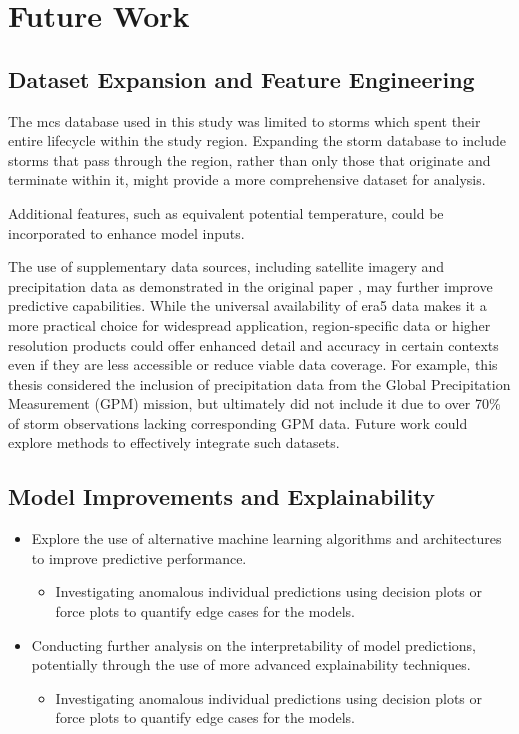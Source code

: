 \section{Future Work}

\subsection{Dataset Expansion and Feature Engineering}

The \acrshort{mcs} database used in this study was limited to storms which spent their entire lifecycle within the study region. Expanding the storm database to include storms that pass through the region, rather than only those that originate and terminate within it, might provide a more comprehensive dataset for analysis. 

Additional features, such as equivalent potential temperature, could be incorporated to enhance model inputs.

The use of supplementary data sources, including satellite imagery and precipitation data as demonstrated in the original paper \citep{Hill2023}, may further improve predictive capabilities. While the universal availability of \acrshort{era5} data makes it a more practical choice for widespread application, region-specific data or higher resolution products could offer enhanced detail and accuracy in certain contexts even if they are less accessible or reduce viable data coverage. For example, this thesis considered the inclusion of precipitation data from the Global Precipitation Measurement (GPM) mission, but ultimately did not include it due to over 70\% of storm observations lacking corresponding GPM data. Future work could explore methods to effectively integrate such datasets.

\subsection{Model Improvements and Explainability}

\begin{itemize}
    \item Explore the use of alternative machine learning algorithms and architectures to improve predictive performance.
    \begin{itemize}
        \item Investigating anomalous individual predictions using decision plots or force plots to quantify edge cases for the models.
    \end{itemize}
    \item Conducting further analysis on the interpretability of model predictions, potentially through the use of more advanced explainability techniques.
    \begin{itemize}
        \item Investigating anomalous individual predictions using decision plots or force plots to quantify edge cases for the models.
    \end{itemize}
\end{itemize}